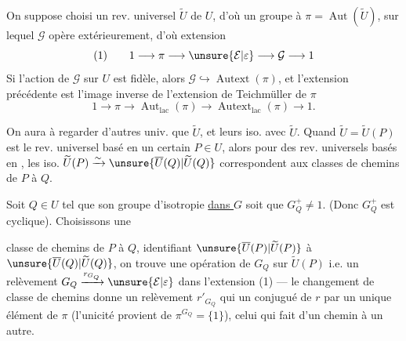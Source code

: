 
On suppose choisi un rev. universel $\widetilde U$ de $U$, d'où un groupe à  $\pi=\operatorname{Aut}(\widetilde U)$, sur lequel $\mathcal G$ opère extérieurement, d'où extension
\[
(1)\qquad 1\longrightarrow\pi\longrightarrow\unsure{\mathcal E|\varepsilon}\longrightarrow\mathcal G\longrightarrow 1
\]
Si l'action de $\mathcal G$ sur $U$ est fidèle, 
alors $\mathcal G\hookrightarrow\operatorname{Autext}(\pi)$, et l'extension précédente est l'image inverse de l'extension de Teichmüller de $\pi$
\[
1\longrightarrow\pi\longrightarrow\operatorname{Aut}_{\mathrm{lac}}(\pi)\longrightarrow\operatorname{Autext}_{\mathrm{lac}}(\pi)\longrightarrow 1.
\]

 On aura à regarder d'autres  univ. que $\widetilde U$, et leurs iso. avec $\widetilde U$.
Quand $\widetilde U=\widetilde U(P)$ est le rev. universel basé en un certain $P\in U$, alors pour des rev. universels  basés en   ,
les iso. $\widetilde U(P)\xrightarrow{\sim}\unsure{\overline U(Q)|\widetilde U(Q)}$ correspondent  aux classes de chemins de $P$ à $Q$.

Soit  $Q\in U$ tel que son groupe d'isotropie   \uline{dans $G$} soit  que $G_Q^+\ne1$.
(Donc $G_Q^+$ est cyclique). Choisissons une


classe de chemins \inserted{$\lambda$} de $P$ à $Q$, identifiant $\unsure{\overline U(P)|\widetilde U(P)}$ à $\unsure{\overline U(Q)|\widetilde U(Q)}$, on trouve une opération de $G_Q$ sur $\widetilde U(P)$ i.e. un relèvement $G_Q\xrightarrow{r_{G_Q}}\unsure{\mathcal E|\varepsilon}$ dans l'extension (1) --- le changement de classe de chemins  donne un relèvement $r'_{G_Q}$ qui  un conjugué de $r$ par un unique élément de $\pi$  (l'unicité provient de $\pi^{G_Q}=\{1\}$),  celui qui fait  d'un chemin à un autre.

